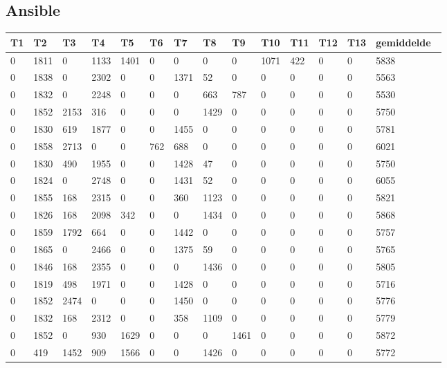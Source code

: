 \subsection{Ansible}
\label{dataset:netwerkverkeer:ansible}
\begin{longtable}{ | l | l | l | l | l | l | l | l | l | l | l | l | l | |l | }
\hline
	T1 & T2 & T3 & T4 & T5 & T6 & T7 & T8 & T9 & T10 & T11 & T12 & T13 & gemiddelde\  \\ \hline
	0 & 1811 & 0 & 1133 & 1401 & 0 & 0 & 0 & 0 & 1071 & 422 & 0 & 0 & 5838 \\ \hline
	0 & 1838 & 0 & 2302 & 0 & 0 & 1371 & 52 & 0 & 0 & 0 & 0 & 0 & 5563  \\ \hline
	0 & 1832 & 0 & 2248 & 0 & 0 & 0 & 663 & 787 & 0 & 0 & 0 & 0 & 5530 \\ \hline
	0 & 1852 & 2153 & 316 & 0 & 0 & 0 & 1429 & 0 & 0 & 0 & 0 & 0 & 5750 \\ \hline
	0 & 1830 & 619 & 1877 & 0 & 0 & 1455 & 0 & 0 & 0 & 0 & 0 & 0 & 5781 \\ \hline
	0 & 1858 & 2713 & 0 & 0 & 762 & 688 & 0 & 0 & 0 & 0 & 0 & 0 & 6021 \\ \hline
	0 & 1830 & 490 & 1955 & 0 & 0 & 1428 & 47 & 0 & 0 & 0 & 0 & 0 & 5750 \\ \hline
	0 & 1824 & 0 & 2748 & 0 & 0 & 1431 & 52 & 0 & 0 & 0 & 0 & 0 & 6055 \\ \hline
	0 & 1855 & 168 & 2315 & 0 & 0 & 360 & 1123 & 0 & 0 & 0 & 0 & 0 & 5821 \\ \hline
	0 & 1826 & 168 & 2098 & 342 & 0 & 0 & 1434 & 0 & 0 & 0 & 0 & 0 & 5868 \\ \hline
	0 & 1859 & 1792 & 664 & 0 & 0 & 1442 & 0 & 0 & 0 & 0 & 0 & 0 & 5757 \\ \hline
	0 & 1865 & 0 & 2466 & 0 & 0 & 1375 & 59 & 0 & 0 & 0 & 0 & 0 & 5765 \\ \hline
	0 & 1846 & 168 & 2355 & 0 & 0 & 0 & 1436 & 0 & 0 & 0 & 0 & 0 & 5805 \\ \hline
	0 & 1819 & 498 & 1971 & 0 & 0 & 1428 & 0 & 0 & 0 & 0 & 0 & 0 & 5716 \\ \hline
	0 & 1852 & 2474 & 0 & 0 & 0 & 1450 & 0 & 0 & 0 & 0 & 0 & 0 & 5776 \\ \hline
	0 & 1832 & 168 & 2312 & 0 & 0 & 358 & 1109 & 0 & 0 & 0 & 0 & 0 & 5779 \\ \hline
	0 & 1852 & 0 & 930 & 1629 & 0 & 0 & 0 & 1461 & 0 & 0 & 0 & 0 & 5872 \\ \hline
	0 & 419 & 1452 & 909 & 1566 & 0 & 0 & 1426 & 0 & 0 & 0 & 0 & 0 & 5772 \\ \hline

\end{longtable}
